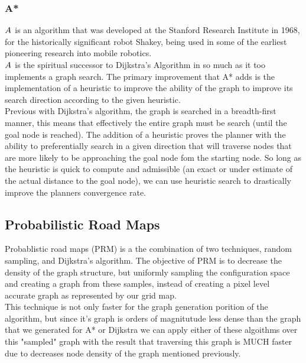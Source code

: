 \documentclass[journal]{IEEEtran}
\begin{document}
\subsubsection{A*}

$A^{\*}$ is an algorithm that was developed at the Stanford Research Institute in 1968, for the historically significant robot Shakey, being used in some of the earliest pioneering research into mobile robotics.\\


$A^{\*}$ is the spiritual successor to Dijkstra's Algorithm in so much as it too implements a graph search. The primary improvement that A* adds is the implementation of a heuristic to improve the ability of the graph to improve its search direction according to the given heuristic.\\ 

Previous with Dijkstra's algorithm, the graph is searched in a breadth-first manner, this means that effectively the entire graph must be search (until the goal node is reached). The addition of a heuristic proves the planner with the ability to preferentially search in a given direction that will traverse nodes that are more likely to be approaching the goal node fom the starting node. So long as the heuristic is quick to compute and admissible (an exact or under estimate of the actual distance to the goal node), we can use heuristic search to drastically improve the planners convergence rate. 


\subsection{Probabilistic Road Maps}

Probablistic road maps (PRM) is a the combination of two techniques, random sampling, and Dijkstra's algorithm. The objective of PRM is to decrease the density of the graph structure, but uniformly sampling the configuration space and creating a graph from these samples, instead of creating a pixel level accurate graph as represented by our grid map. \\

This technique is not only faster for the graph generation porition of the algorithm, but since it's graph is orders of magnitutude less dense than the graph that we generated for A* or Dijkstra we can apply either of these algoithms over this "sampled" graph with the result that traversing this graph is MUCH faster due to decreases node density of the graph mentioned previously.
\end{document}

